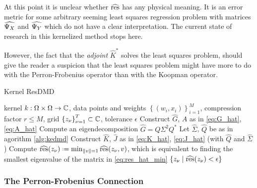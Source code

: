 At this point it is unclear whether $\widehat{ \text{res} }$ has any physical meaning. It is 
an error metric for some arbitrary seeming least squares regression problem with matrices 
$\widehat{ \Psi_X }$ and $\widehat{ \Psi_Y }$ which do not have a clear interpretation. The 
current state of research in this kernelized method stops here. 

However, 
the fact that the \emph{adjoint} $\widehat{ K }^*$ solves the least squares problem, 
should give the reader a suspicion that the least squares problem might have more to do 
with the Perron-Frobenius operator than with the Koopman operator. 

\begin{algorithm}
    \caption{Kernel ResDMD}
    \label{alg:kresdmd}
    \begin{algorithmic}[1]
        \Require kernel $k : \Omega \times \Omega \to \mathbb{C}$, data points and weights 
            $\left\{ (w_i, x_i) \right\}_{i=1}^M$, compression factor $r \leq M$,
            grid $\left\{ z_\nu \right\}_{\nu=1}^T \subset \mathbb{C}$,
            tolerance $\epsilon$
        \State Construct $\widehat{G}$, $\widehat{A}$ as in \ref{eq:G_hat}, \ref{eq:A_hat}
        \State Compute an eigendecomposition $\widehat{G} = Q \Sigma^2 Q^*$
        \State Let $\widehat{\Sigma}$, $\widehat{Q}$ be as in agorithm \ref{alg:kedmd}
        \State Construct $\widehat{ K }$, $\widehat{ J }$ as in \ref{eq:K_hat}, 
            \ref{eq:J_hat} (with $\widehat{ Q }$ and $\widehat{ \Sigma }$)
        \State Compute $\widehat{ \res } (z_\nu) 
            \defeq \min_{\| v \| = 1} \widehat{ \res } (z_\nu, v)$, which is equivalent 
            to finding the smallest eigenvalue of the matrix in \ref{eq:res_hat_min}
        \EndFor
        \State \Return $\left\{ z_\nu \mid \widehat{\text{res}} (z_\nu) < \epsilon \right\}$
    \end{algorithmic}
\end{algorithm}


\subsubsection{The Perron-Frobenius Connection}

